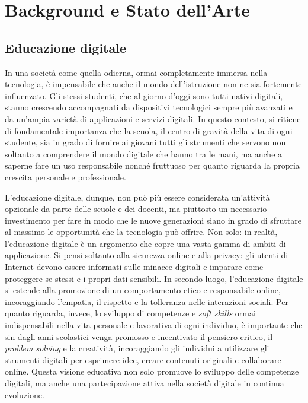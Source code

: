 \chapter{Background e Stato dell'Arte}\label{cap:Background}

\section{Educazione digitale}
In una società come quella odierna, ormai completamente immersa nella tecnologia, è impensabile che anche il mondo dell'istruzione non ne sia fortemente influenzato. 
Gli stessi studenti, che al giorno d'oggi sono tutti nativi digitali, stanno crescendo accompagnati da dispositivi tecnologici sempre più avanzati e da un'ampia varietà
di applicazioni e servizi digitali. In questo contesto, si ritiene di fondamentale importanza che la scuola, il centro di gravità della vita di ogni studente, sia in grado 
di fornire ai giovani tutti gli strumenti che servono non soltanto a comprendere il mondo digitale che hanno tra le mani, ma anche a saperne fare un uso responsabile nonché
fruttuoso per quanto riguarda la propria crescita personale e professionale. 

L'educazione digitale, dunque, non può più essere considerata un'attività opzionale da parte delle scuole e dei docenti, ma piuttosto un necessario investimento per fare in modo 
che le nuove generazioni siano in grado di sfruttare al massimo le opportunità che la tecnologia può offrire. 
Non solo: in realtà, l'educazione digitale è un argomento che copre una vasta gamma di ambiti di applicazione.
Si pensi soltanto alla sicurezza online e alla privacy: gli utenti di Internet devono essere informati sulle minacce digitali e imparare
come proteggere se stessi e i propri dati sensibili. 
In secondo luogo, l'educazione digitale si estende alla promozione di un comportamento etico e responsabile online, incoraggiando
l'empatia, il rispetto e la tolleranza nelle interazioni sociali. 
Per quanto riguarda, invece, lo sviluppo di competenze e \textit{soft skills} ormai indispensabili nella vita personale e lavorativa
di ogni individuo, è importante che sin dagli anni scolastici venga promosso e incentivato il pensiero critico, il \textit{problem solving} e la creatività, incoraggiando gli individui a
utilizzare gli strumenti digitali per esprimere idee, creare contenuti originali e collaborare online. Questa visione educativa non solo promuove lo sviluppo delle competenze digitali, ma anche una partecipazione
attiva nella società digitale in continua evoluzione.

